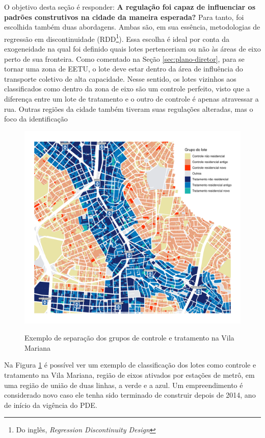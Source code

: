 O objetivo desta seção é responder: \textbf{A regulação foi capaz de influenciar os padrões construtivos na cidade da maneira esperada?} Para tanto, foi escolhida também duas abordagens. Ambas são, em sua essência, metodologias de regressão em discontinuidade (RDD\footnote{Do inglês, \textit{Regression Discontinuity Design}}). Essa escolha é ideal por conta da exogeneidade na qual foi definido quais lotes pertenceriam ou não às áreas de eixo perto de sua fronteira. Como comentado na Seção \ref{sec:plano-diretor}, para se tornar uma zona de EETU, o lote deve estar dentro da área de influência do transporte coletivo de alta capacidade. Nesse sentido, os lotes vizinhos aos classificados como dentro da zona de eixo são um controle perfeito, visto que a diferença entre um lote de tratamento e o outro de controle é apenas atravessar a rua. Outras regiões da cidade também tiveram suas regulações alteradas, mas o foco da identificação 

\begin{figure}[h]
    \centering
    \caption{Exemplo de separação dos grupos de controle e tratamento na Vila Mariana}
    \includegraphics[width = \textwidth]{figuras/mapa-lotes-metro.pdf}
    \label{fig:mapaRDD}
\end{figure}

Na Figura \ref{fig:mapaRDD} é possível ver um exemplo de classificação dos lotes como controle e tratamento na Vila Mariana, região de eixos ativados por estações de metrô, em uma região de união de duas linhas, a verde e a azul. Um empreendimento é considerado novo caso ele tenha sido terminado de construir depois de 2014, ano de início da vigência do PDE. 

